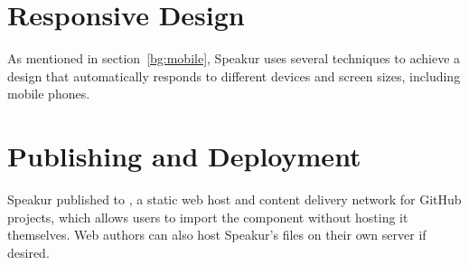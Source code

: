 \section{Responsive Design}
\label{sec:responsive}
As mentioned in section~\ref{bg:mobile}, Speakur uses several techniques to achieve a design that automatically responds to different devices and screen sizes, 
including mobile phones.




\section{Publishing and Deployment}
\label{publishing}

Speakur published to , 
a static web host and content delivery network for GitHub projects, 
which allows users to import the component without hosting it themselves.
Web authors can also host Speakur's files on their own server if desired.

